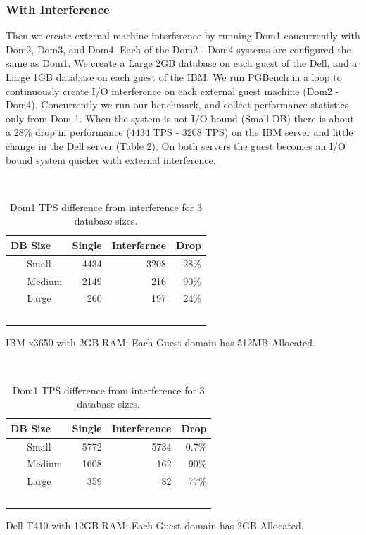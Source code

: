 \subsubsection{With Interference}
Then we create external machine interference by running Dom1 concurrently with Dom2, Dom3, and Dom4. Each of the Dom2 - Dom4 systems are configured the same as Dom1.  We create a Large 2GB database on each guest of the Dell, and a Large 1GB database on each guest of the IBM.  We run PGBench in a loop to continuously create I/O interference on each external guest machine (Dom2 - Dom4). Concurrently we run our benchmark, and collect performance statistics only from Dom-1.  When the system is not I/O bound (Small DB) there is about a 28\% drop in performance (4434 TPS - 3208 TPS) on the IBM server and little change in the Dell server (Table \ref{fig:tps1}).  On both servers the guest becomes an I/O bound system quicker with external interference.

\begin{table}[h]
\begingroup
    \fontsize{10pt}{12pt}\selectfont
\begin{subtable}[h]{0.45\textwidth}
  \begin{tabular}{ l | r | r | r }
    DB Size & Single & Interfernce & Drop \\
    \hline
    Small & 4434 & 3208 & 28\% \\ \hline
    Medium & 2149 & 216 & 90\% \\ \hline
    Large & 260 & 197 & 24\% \\  \hline
    \hline
  \end{tabular}
\caption{IBM x3650 with 2GB RAM:  Each Guest domain has 512MB Allocated.}
\end{subtable}
\hfill
\begin{subtable}[h]{0.45\textwidth}
  \begin{tabular}{ l | r | r | r }
    DB Size & Single & Interference & Drop \\
    \hline
    Small & 5772 & 5734 & 0.7\% \\ \hline
    Medium & 1608 & 162 & 90\% \\ \hline
    Large & 359 & 82 & 77\% \\  \hline
    \hline
  \end{tabular}
\caption{Dell T410 with 12GB RAM:  Each Guest domain has 2GB Allocated. }
\end{subtable}
\caption{Dom1 TPS difference from interference for 3 database sizes.}
\label{fig:tps1}
\endgroup
\end{table}

